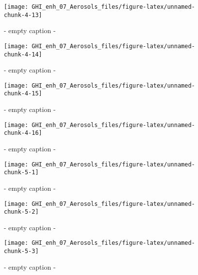 \documentclass[
  10pt,
  a4paper,oneside]{article}
\begin{document}
\begin{figure}[H]

{\centering \texttt{[image: GHI\_enh\_07\_Aerosols\_files/figure-latex/unnamed-chunk-4-13]} 

}

\caption{ - empty caption - }\label{fig:unnamed-chunk-4-13}
\end{figure}
\begin{figure}[H]

{\centering \texttt{[image: GHI\_enh\_07\_Aerosols\_files/figure-latex/unnamed-chunk-4-14]} 

}

\caption{ - empty caption - }\label{fig:unnamed-chunk-4-14}
\end{figure}
\begin{figure}[H]

{\centering \texttt{[image: GHI\_enh\_07\_Aerosols\_files/figure-latex/unnamed-chunk-4-15]} 

}

\caption{ - empty caption - }\label{fig:unnamed-chunk-4-15}
\end{figure}
\begin{figure}[H]

{\centering \texttt{[image: GHI\_enh\_07\_Aerosols\_files/figure-latex/unnamed-chunk-4-16]} 

}

\caption{ - empty caption - }\label{fig:unnamed-chunk-4-16}
\end{figure}
\begin{figure}[H]

{\centering \texttt{[image: GHI\_enh\_07\_Aerosols\_files/figure-latex/unnamed-chunk-5-1]} 

}

\caption{ - empty caption - }\label{fig:unnamed-chunk-5-1}
\end{figure}
\begin{figure}[H]

{\centering \texttt{[image: GHI\_enh\_07\_Aerosols\_files/figure-latex/unnamed-chunk-5-2]} 

}

\caption{ - empty caption - }\label{fig:unnamed-chunk-5-2}
\end{figure}
\begin{figure}[H]

{\centering \texttt{[image: GHI\_enh\_07\_Aerosols\_files/figure-latex/unnamed-chunk-5-3]} 

}

\caption{ - empty caption - }\label{fig:unnamed-chunk-5-3}
\end{figure}
\end{document}

